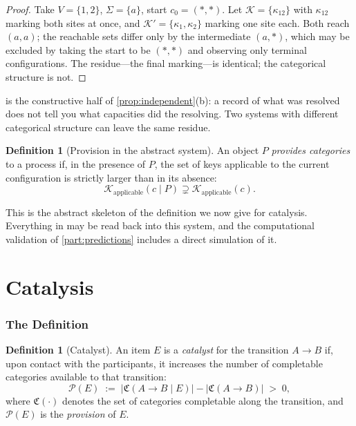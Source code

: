 \documentclass[11pt,twocolumn,a4paper]{article}
\theoremstyle{plain}
\theoremstyle{definition}
\newtheorem{definition}[theorem]{Definition}
\theoremstyle{remark}
\newcommand{\Cat}{\mathfrak{C}}
\newcommand{\Enz}{E}
\newcommand{\prov}{\mathcal{P}}
\begin{document}
\begin{proof}
Take $V = \{1,2\}$, $\Sigma = \{a\}$, start $c_0 = (\ast,\ast)$. Let
$\mathcal{K} = \{\kappa_{12}\}$ with $\kappa_{12}$ marking both sites at once,
and $\mathcal{K}' = \{\kappa_1, \kappa_2\}$ marking one site each. Both reach
$(a,a)$; the reachable sets differ only by the intermediate
$(a,\ast)$, which may be excluded by taking the start to be
$(\ast,\ast)$ and observing only terminal configurations. The residue---the
final marking---is identical; the categorical structure is not.
\end{proof}

 is the constructive half of
\cref{prop:independent}(b): a record of what was resolved does not tell you what
capacities did the resolving. Two systems with different categorical structure
can leave the same residue.

\begin{definition}[Provision in the abstract system]
\label{def:abstract-provision}
An object $P$ \emph{provides categories} to a process if, in the presence of
$P$, the set of keys applicable to the current configuration is strictly larger
than in its absence:
\begin{equation}
\mathcal{K}_{\text{applicable}}(c \mid P) \supsetneq
\mathcal{K}_{\text{applicable}}(c) .
\label{eq:abstract-provision}
\end{equation}
\end{definition}

This is the abstract skeleton of the definition we now give for catalysis.
Everything in \cref{part:catalysis} may be read back into this system, and the
computational validation of \cref{part:predictions} includes a direct simulation
of it.

\part{Catalysis}
\label{part:catalysis}

\section{The Definition}
\label{sec:definition}

\begin{definition}[Catalyst]
\label{def:catalyst}
An item $\Enz$ is a \emph{catalyst} for the transition $A \to B$ if, upon
contact with the participants, it increases the number of completable categories
available to that transition:
\begin{equation}
\prov(\Enz) \;:=\; \bigl| \Cat(A \to B \mid \Enz) \bigr| -
\bigl| \Cat(A\to B) \bigr| \;>\; 0 ,
\label{eq:provision}
\end{equation}
where $\Cat(\cdot)$ denotes the set of categories completable along the
transition, and $\prov(\Enz)$ is the \emph{provision} of $\Enz$.
\end{definition}
\end{document}

